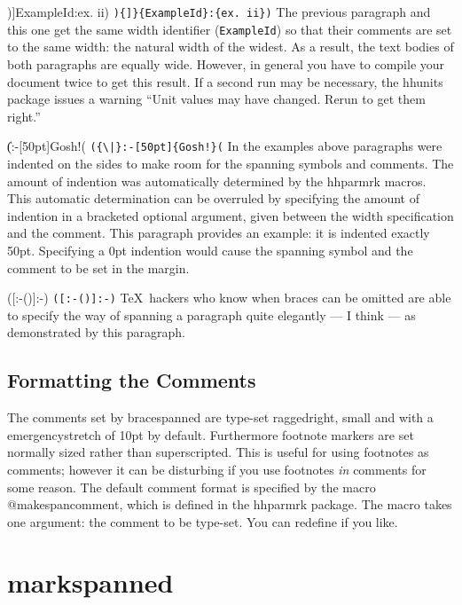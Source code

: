 \documentclass[11pt]{article}
\makeatletter
\def\packagename#1{{\sffamily #1}}     %
\def\macroname#1{{\ttfamily\@ttbs#1}}  %
\def\envirname#1{{\ttfamily #1}}       %
\def\hhparmrk{\packagename{hhparmrk}\xspace}
\def\hhunits{\packagename{hhunits}\xspace}
\def\={\verb=}
\def\<#1>{\macroname{#1}}
\def\fverb{\sbox\@tempboxa\bgroup\verb}
\def\brevf{%
  \egroup\leavevmode{\setlength\fboxsep{2pt}\fbox{\box\@tempboxa}} }
\makeatother
\begin{document}
\begin{bracespanned}
\begin{bracespanned}){]}{ExampleId}:{ex. ii})
\fverb=){]}{ExampleId}:{ex. ii})=\brevf
The previous paragraph and this one get the same width identifier
(\=ExampleId=) so that their comments are set to the same width:
the natural width of the widest. As a result, the text bodies of
both paragraphs are equally wide. However, in general you have to
compile your document twice to get this result. If a second run
may be necessary, the \hhunits package issues a warning ``Unit
values may have changed. Rerun to get them right.''
\end{bracespanned}

\begin{bracespanned}({\|}:-[50pt]{Gosh!}(
\fverb=({\|}:-[50pt]{Gosh!}(=\brevf
In the examples above paragraphs were indented on the sides to make room
for the spanning symbols and comments. The amount of indention was
automatically determined by the \hhparmrk macros. This automatic
determination can be overruled by specifying the amount of indention
in a bracketed optional argument, given between the width
specification and the comment. This paragraph provides an example:
it is indented exactly 50pt. Specifying a 0pt indention
would cause the spanning symbol and the comment to be set in the
margin.
\end{bracespanned}

\begin{bracespanned}([:-()]:-)
\fverb=([:-()]:-)=\brevf
\TeX\ hackers who know when braces can be omitted are able to specify
the way of spanning a paragraph quite elegantly --- I think --- as
demonstrated by this paragraph.
\end{bracespanned}

\subsection{Formatting the Comments}
The comments set by \envirname{bracespanned} are type-set raggedright,
small and with a emergencystretch of 10pt by default. Furthermore
footnote markers are set normally sized rather than
superscripted. This is useful for using footnotes as comments; however
it can be disturbing if you use footnotes {\em in} comments for some reason.
The default comment format is specified by the macro
\<@makespancomment>, which is defined in the \hhparmrk package.
The macro takes one argument: the comment to be type-set.
You can redefine if you like.

\section{\envirname{markspanned}}


\end{bracespanned}
\end{document}
